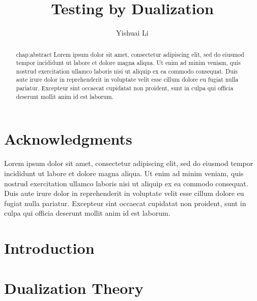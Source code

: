 \documentclass[12pt,oneside]{amsbook}
\title{Testing by Dualization}
\author{Yishuai Li}
\theoremstyle{definition}
\numberwithin{section}{chapter}
\numberwithin{figure}{chapter}
\numberwithin{equation}{chapter}
\numberwithin{definition}{chapter}
\begin{document}
\frontmatter

\maketitle

\copyrightpage

\chapter*{Acknowledgments}
\label{chap:acknowledgments}

Lorem ipsum dolor sit amet, consectetur adipiscing elit, sed do eiusmod tempor
incididunt ut labore et dolore magna aliqua. Ut enim ad minim veniam, quis
nostrud exercitation ullamco laboris nisi ut aliquip ex ea commodo
consequat. Duis aute irure dolor in reprehenderit in voluptate velit esse cillum
dolore eu fugiat nulla pariatur. Excepteur sint occaecat cupidatat non proident,
sunt in culpa qui officia deserunt mollit anim id est laborum.


\begin{abstract}{chap:abstract}
  Lorem ipsum dolor sit amet, consectetur adipiscing elit, sed do eiusmod tempor
  incididunt ut labore et dolore magna aliqua. Ut enim ad minim veniam, quis
  nostrud exercitation ullamco laboris nisi ut aliquip ex ea commodo
  consequat. Duis aute irure dolor in reprehenderit in voluptate velit esse
  cillum dolore eu fugiat nulla pariatur. Excepteur sint occaecat cupidatat non
  proident, sunt in culpa qui officia deserunt mollit anim id est laborum.
\end{abstract}

\tableofcontents
\listoffigures

\mainmatter

\chapter{Introduction}
\label{chap:introduction}


\chapter{Dualization Theory}
\label{chap:theory}

\end{document}
